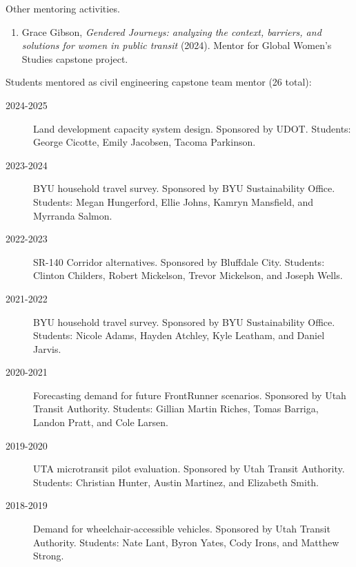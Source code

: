 \documentclass[margin,line]{res}
\newif\ifdetail
\newcounter{enuminitialize}
\newenvironment{myenum}[1][]
{%
 \setcounter{enuminitialize}{#1}
 \addtocounter{enuminitialize}{2}
 \begin{enumerate}[left= 4pt, itemsep=8pt, start=\value{enuminitialize}, label=\arabic*\addtocounter{enumi}{-2}]
}
{%
 \end{enumerate}
}
\newcommand{\secfont}{\scshape }
\newcommand{\acc}{\scshape }
\begin{document}
\begin{resume}
Other mentoring activities.
\vspace{0.2cm}
\begin{myenum}[1]
  \ifdetail {\color{NavyBlue} \fi
  \item Grace Gibson, \textit{Gendered Journeys: analyzing the context, barriers, and solutions for women in public transit} (2024). Mentor for Global Women's Studies capstone project.
  \ifdetail } \fi
\end{myenum}



Students mentored as civil engineering capstone team mentor (26 total):
\vspace{0.2cm}
\begin{description}
  \ifdetail {\color{NavyBlue} \fi
  \item[2024-2025] Land development capacity system design. Sponsored by UDOT. Students: George Cicotte, Emily Jacobsen, Tacoma Parkinson.
  \item[2023-2024] BYU household travel survey. Sponsored by BYU Sustainability Office. Students: 
    Megan Hungerford, Ellie Johns, Kamryn Mansfield, and Myrranda Salmon.
  \item[2022-2023] SR-140 Corridor alternatives. Sponsored by Bluffdale City. Students:
    Clinton Childers, Robert Mickelson, Trevor Mickelson, and Joseph Wells.
  \item[2021-2022] BYU household travel survey. Sponsored by BYU Sustainability Office. Students: Nicole Adams, Hayden Atchley, Kyle Leatham, and Daniel Jarvis.
  \item[2020-2021] Forecasting demand for future FrontRunner scenarios. Sponsored by Utah Transit Authority. Students: Gillian Martin Riches, Tomas Barriga, Landon Pratt, and Cole Larsen.
  \ifdetail } \fi
  \item[2019-2020] UTA microtransit pilot evaluation. Sponsored by Utah Transit Authority. Students: Christian Hunter, Austin Martinez, and Elizabeth Smith.
  \item[2018-2019] Demand for wheelchair-accessible vehicles. Sponsored by Utah Transit Authority. Students: Nate Lant, Byron Yates, Cody Irons, and Matthew Strong.
\end{description}


%




\end{resume}
\end{document}
